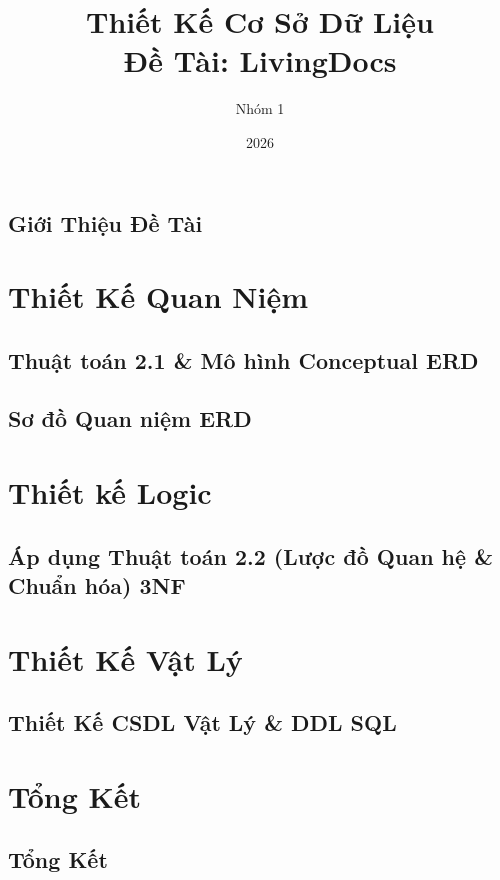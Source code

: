 \documentclass[letterpaper,11pt,leqno]{book}
\title{Thiết Kế Cơ Sở Dữ Liệu \\ \large Đề Tài: LivingDocs}
\author{Nhóm 1}
\date{2026}
\begin{document}
\maketitle

\frontmatter
\tableofcontents

\chapter{Giới Thiệu Đề Tài}



\mainmatter

\part{Thiết Kế Quan Niệm}\label{p:conceptual}


\chapter{Thuật toán 2.1 \& Mô hình Conceptual ERD}\label{c:task_1}




\chapter{Sơ đồ Quan niệm ERD }\label{c:erd_uml}


\part{Thiết kế Logic}\label{p:logical}

\chapter{Áp dụng Thuật toán 2.2 (Lược đồ Quan hệ \& Chuẩn hóa) 3NF}\label{c:figures}



\part{Thiết Kế Vật Lý}\label{p:implementation}


\chapter{Thiết Kế CSDL Vật Lý \& DDL SQL}\label{c:mapping_impl}



\part{Tổng Kết}\label{p:conclusion}

\chapter{Tổng Kết }\label{c:summary}


\end{document}
